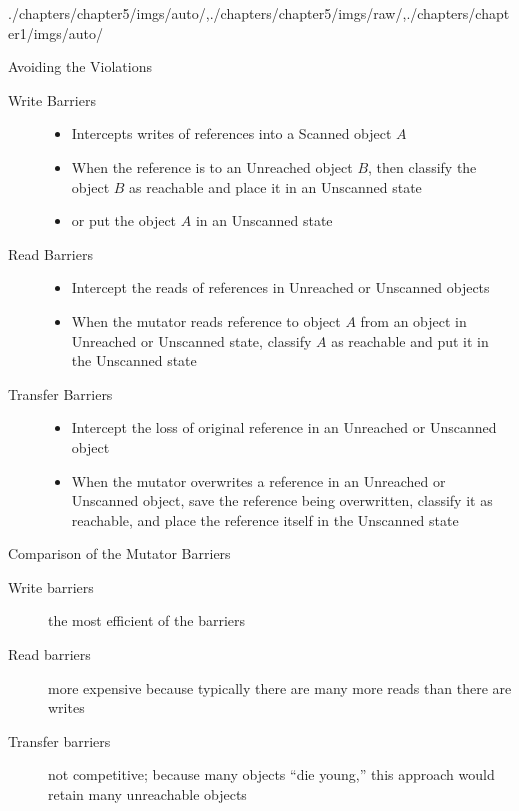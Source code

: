 \begin{graphicspathcontext}{{./chapters/chapter5/imgs/auto/},{./chapters/chapter5/imgs/raw/},{./chapters/chapter1/imgs/auto/}}
\begin{bibunit}[apalike]
\begin{frame}[background=8]{Avoiding the Violations}
	\begin{small}
		\begin{description}
			\item[Write Barriers] \begin{itemize}
				\item Intercepts writes of references into a Scanned object $A$
				\item When the reference is to an Unreached object $B$, then classify the object $B$ as reachable and place it in an Unscanned state
				\item or put the object $A$ in an Unscanned state
			\end{itemize}
			\item[Read Barriers] \begin{itemize}
				\item Intercept the reads of references in Unreached or Unscanned objects
				\item When the mutator reads reference to object $A$ from an object in Unreached or Unscanned state, classify $A$ as reachable and put it in the Unscanned state
			\end{itemize}
			\item[Transfer Barriers] \begin{itemize}
				\item Intercept the loss of original reference in an Unreached or Unscanned object
				\item When the mutator overwrites a reference in an Unreached or Unscanned object, save the reference being overwritten, classify it as reachable, and place the reference itself in the Unscanned state
			\end{itemize}
		\end{description}
	\end{small}
\end{frame}

\begin{frame}[background=6]{Comparison of the Mutator Barriers}
	\begin{description}
		\item[Write barriers] the most efficient of the barriers
		\vfill
		\item[Read barriers] more expensive because typically there are many more reads than there are writes
		\vfill
		\item[Transfer barriers] not competitive; because many objects ``die young,'' this approach would retain many unreachable objects
	\end{description}
\end{frame}


\end{bibunit}
\end{graphicspathcontext}
